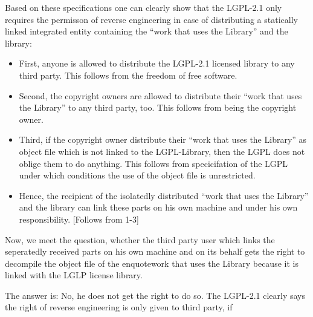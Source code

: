 Based on these specifications one can clearly show that the LGPL-2.1 only
requires the permisson of reverse engineering in case of distributing a
statically linked integrated entity containing the \enquote{work that uses the
Library} and the library:

\begin{itemize}
\item First, anyone is allowed to distribute the LGPL-2.1 licensed library to
any third party. This follows from the freedom of free software.

\item Second, the copyright owners are allowed to distribute their \enquote{work
that uses the Library} to any third party, too. This follows from being the copyright
owner.

\item Third, if the copyright owner distribute their \enquote{work that
uses the Library} as object file which is not linked to the LGPL-Library, then
the LGPL does not oblige them to do anything. This follows from specicifation of
the LGPL under which conditions the use of the object file is unrestricted.

\item Hence, the recipient of the isolatedly distributed \enquote{work
that uses the Library} and the library can link these parts on his own machine
and under his own responsibility. [Follows from 1-3]
\end{itemize}

Now, we meet the question, whether the third party user which links the
seperatedly received parts on his own machine and on its behalf gets the right
to decompile the object file of the enquote{work that uses the Library} because it
is linked with the LGLP license library.

The answer is: No, he does not get the right to do so. The LGPL-2.1 clearly says
the right of reverse engineering is only given to third party, if 

%
